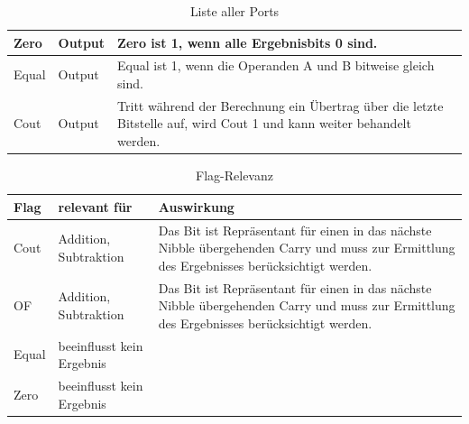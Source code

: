 \documentclass[11pt]{report}
\begin{document}
\begin{table}[]
\begin{tabular}{|l|l|p{11cm}|}
			Zero & Output & Zero ist 1, wenn alle Ergebnisbits 0 sind. \\ \hline
			
			Equal & Output & Equal ist 1, wenn die Operanden A und B bitweise gleich sind. \\ \hline
			
			Cout & Output & Tritt während der Berechnung ein Übertrag über die letzte Bitstelle auf, wird Cout 1 und kann weiter behandelt werden. \\ \hline
			
		\end{tabular}
		\caption{Liste aller Ports}
	\end{table}
	
	\begin{table}[]
		\centering
		\label{flagtable}
		\begin{tabular}{l|l|p{8cm}}
			Flag  & relevant für                       & Auswirkung   \\ \hline
			Cout  & Addition, Subtraktion              & Das Bit ist Repräsentant für einen in das nächste Nibble übergehenden Carry und muss zur Ermittlung des Ergebnisses berücksichtigt werden.\\
			OF    & Addition, Subtraktion              & Das Bit ist Repräsentant für einen in das nächste Nibble übergehenden Carry und muss zur Ermittlung des Ergebnisses berücksichtigt werden.\\
			Equal & beeinflusst kein Ergebnis          &                  \\
			Zero  & beeinflusst kein Ergebnis          &                          
		\end{tabular}
		\caption{Flag-Relevanz}
	\end{table}
	
	
\end{document}
